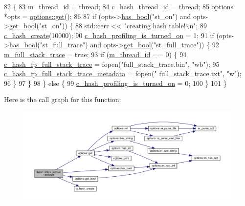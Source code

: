 \begin{DoxyCode}
82                                         \{
83   \hyperlink{classlbann_1_1stack__profiler_a1bd742927294507fe67184cb4f47b86c}{m\_thread\_id} = thread;
84   \hyperlink{stack__profiler_8cpp_a92d77137d4b87923f488746604d72f94}{c\_hash\_thread\_id} = thread;
85   \hyperlink{classoptions}{options} *opts = \hyperlink{classoptions_a9ecfe9c365269df68a41b961c31ae3f5}{options::get}();
86 
87   \textcolor{keywordflow}{if} (opts->\hyperlink{classoptions_aafb1d2a7ccde0b1bf786230ba4080ecd}{has\_bool}(\textcolor{stringliteral}{"st\_on"}) and opts->\hyperlink{classoptions_a99aa190102de33e2aed39723929f9fad}{get\_bool}(\textcolor{stringliteral}{"st\_on"})) \{
88     std::cerr << \textcolor{stringliteral}{"creating hash table!\(\backslash\)n"};
89     \hyperlink{stack__profiler_8cpp_ad1c2d92ab2c29021521d36cf4c97e488}{c\_hash\_create}(10000);
90     \hyperlink{stack__profiler_8cpp_a193e8df9f6b1bc5794e9aa25f82e6a5f}{c\_hash\_profiling\_is\_turned\_on} = 1;
91     \textcolor{keywordflow}{if} (opts->\hyperlink{classoptions_aafb1d2a7ccde0b1bf786230ba4080ecd}{has\_bool}(\textcolor{stringliteral}{"st\_full\_trace"}) and opts->\hyperlink{classoptions_a99aa190102de33e2aed39723929f9fad}{get\_bool}(\textcolor{stringliteral}{"st\_full\_trace"})) \{
92       \hyperlink{classlbann_1_1stack__profiler_a7dd8bf137ea417ecf54537d64c6d296a}{m\_full\_stack\_trace} = \textcolor{keyword}{true};
93       \textcolor{keywordflow}{if} (\hyperlink{classlbann_1_1stack__profiler_a1bd742927294507fe67184cb4f47b86c}{m\_thread\_id} == 0) \{
94         \hyperlink{stack__profiler_8cpp_a6cc00bff1b0fcee1e92c726aea92c818}{c\_hash\_fp\_full\_stack\_trace} = fopen(\textcolor{stringliteral}{"full\_stack\_trace.bin"}, \textcolor{stringliteral}{"wb"});
95         \hyperlink{stack__profiler_8cpp_a434aed2bad9781985a12de882aa0ec84}{c\_hash\_fp\_full\_stack\_trace\_metadata} = fopen(\textcolor{stringliteral}{"
      full\_stack\_trace.txt"}, \textcolor{stringliteral}{"w"});
96       \}
97     \}
98   \} \textcolor{keywordflow}{else} \{
99     \hyperlink{stack__profiler_8cpp_a193e8df9f6b1bc5794e9aa25f82e6a5f}{c\_hash\_profiling\_is\_turned\_on} = 0;
100   \}
101 \}
\end{DoxyCode}
Here is the call graph for this function\+:\nopagebreak
\begin{figure}[H]
\begin{center}
\leavevmode
\includegraphics[width=350pt]{classlbann_1_1stack__profiler_a5c8e2ec1f36d36ff8211ec8910063777_cgraph}
\end{center}
\end{figure}

